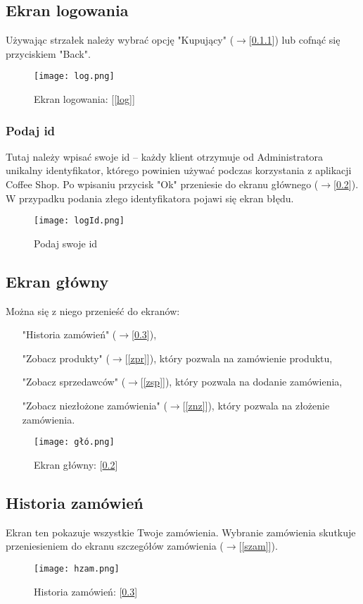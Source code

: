 \subsection{Ekran logowania}
Używając strzałek należy wybrać opcję "Kupujący" ($\rightarrow$[\ref{logId}]) lub cofnąć się przyciskiem "Back".
\label{log}
\begin{figure}
  \centering
  \texttt{[image: log.png]}
  \caption{Ekran logowania: [\ref{log}]}
  \label{logI}
\end{figure}
\subsubsection{Podaj id}
\label{logId}
Tutaj należy wpisać swoje id -- każdy klient otrzymuje od Administratora unikalny identyfikator, którego powinien używać podczas korzystania z aplikacji Coffee Shop. Po wpisaniu przycisk "Ok" przeniesie do ekranu głównego ($\rightarrow$[\ref{głó}]). W przypadku podania złego identyfikatora pojawi się ekran błędu.
\begin{figure}
  \centering
  \texttt{[image: logId.png]}
  \caption{Podaj swoje id}
  \label{logIdI}
\end{figure}
\subsection{Ekran główny}
\label{głó}
Można się z niego przenieść do ekranów: 
\begin{itemize}[leftmargin=5cm]
\item["Historia zamówień"]($\rightarrow$[\ref{hzam}]), 
\item["Zobacz produkty"]($\rightarrow$[\ref{zpr}]), który pozwala na zamówienie produktu, 
\item["Zobacz sprzedawców"]($\rightarrow$[\ref{zsp}]), który pozwala na dodanie zamówienia,
\item["Zobacz niezłożone zamówienia"]($\rightarrow$[\ref{znz}]), który pozwala na złożenie zamówienia.
\end{itemize}
\begin{figure}
  \centering
  \texttt{[image: głó.png]}
  \caption{Ekran główny: [\ref{głó}]}
  \label{głóI}
\end{figure}
\subsection{Historia zamówień}
\label{hzam}
Ekran ten pokazuje wszystkie Twoje zamówienia.
Wybranie zamówienia skutkuje przeniesieniem do ekranu szczegółów zamówienia ($\rightarrow$[\ref{szam}]).
\begin{figure}
  \centering
  \texttt{[image: hzam.png]}
  \caption{Historia zamówień: [\ref{hzam}]}
  \label{hzamI}
\end{figure}
